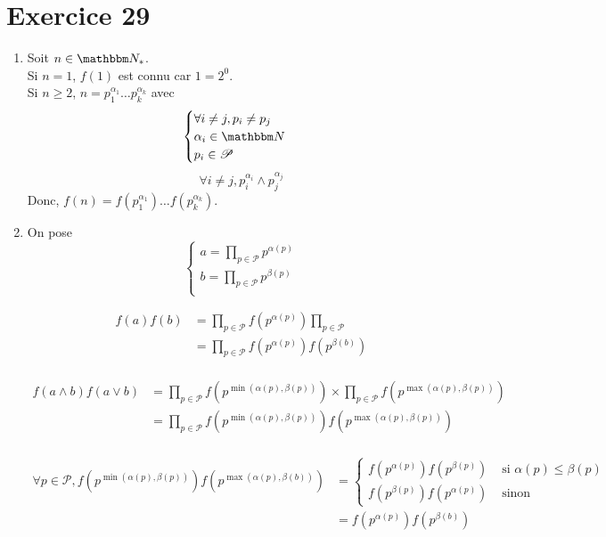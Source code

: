 \part{Exercice 29}

\begin{enumerate}
	\item Soit $n \in \N_*$.\\
		Si $n = 1$,  $f(1)$ est connu car $1 = 2^0$.\\
		Si $n \ge 2$, $n = p_1^{\alpha_1}\ldots p_k^{\alpha_k}$ avec \[
		\begin{cases}
			\forall i \neq j, p_i \neq p_j\\
			\alpha_i \in \N\\
			p_i \in \mathcal{P}
		\end{cases}
		\]
		\[
		\forall i \neq j, p_i^{\alpha_i} \wedge p_j^{\alpha_j}
		\] 
		Donc, $f(n) = f\left( p_1^{\alpha_1} \right) \ldots f\left( p_k^{\alpha_k} \right) $.
	\item On pose \[
	\begin{cases}
		a = \prod_{p \in \mathcal{P}} p^{\alpha(p)}  \\
		b = \prod_{p \in \mathcal{P}} p^{\beta(p)}  \\
	\end{cases}
	\] 

	\begin{align*}
		f(a)f(b) &= \prod_{p \in \mathcal{P}} f(p^{\alpha(p)}) \prod_{p \in \mathcal{P}} \\
		&= \prod_{p \in \mathcal{P}} f(p^{\alpha(p)})f(p^{\beta(b)}) \\
	\end{align*}

	\begin{align*}
		f(a\wedge b)f(a\vee b) &= \prod_{p \in \mathcal{P}} f\left( p^{\min(\alpha(p), \beta(p))} \right) \times \prod_{p \in \mathcal{P}} f\left( p^{\max(\alpha(p), \beta(p))} \right)  \\
		&= \prod_{p \in \mathcal{P}} f\left( p^{\min(\alpha(p), \beta(p))} \right) f\left( p^{\max(\alpha(p), \beta(p))} \right)  \\
	\end{align*}
	
	\begin{align*}
		\forall p \in \mathcal{P},
		f\left( p^{\min(\alpha(p), \beta(p))} \right) f\left( p^{\max(\alpha(p), \beta(b))} \right) &= \begin{cases}
			f\left( p^{\alpha(p)} \right) f\left( p^{\beta(p)} \right) &\text{ si } \alpha(p) \le \beta(p)\\
			f\left( p^{\beta(p)} \right) f\left( p^{\alpha(p)} \right)  & \text{ sinon}
		\end{cases} \\
		&= f\left( p^{\alpha(p)} \right) f\left(p^{\beta(b)}\right) \\
	\end{align*}
	

\end{enumerate}
